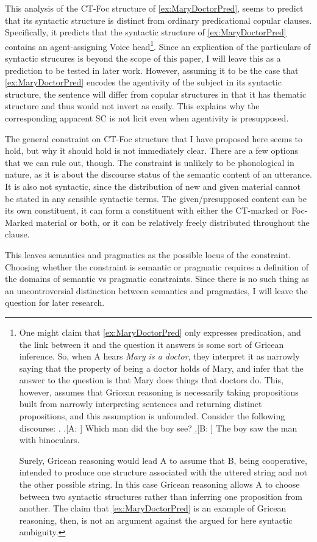 \documentclass[GPFinal]{subfiles}
\begin{document}
This analysis of the CT-Foc structure of \ref{ex:MaryDoctorPred}, seems to predict that its syntactic structure is distinct from ordinary predicational copular clauses.
Specifically, it predicts that the syntactic structure of \ref{ex:MaryDoctorPred} contains an agent-assigning Voice head\footnote{
  One might claim that \ref{ex:MaryDoctorPred} only expresses predication, and the link between it and the question it answers is some sort of Gricean inference.
  So, when A hears \textit{Mary is a doctor}, they interpret it as narrowly saying that the property of being a doctor holds of Mary, and infer that the answer to the question is that Mary does things that doctors do.
  This, however, assumes that Gricean reasoning is necessarily taking propositions built from narrowly interpreting sentences and returning distinct propositions, and this assumption is unfounded.
  Consider the following discourse:
  \ex. 
  \a.[A: ] Which man did the boy see?
  \b.[B: ] The boy saw the man with binoculars.

  Surely, Gricean reasoning would lead A to assume that B, being cooperative, intended to produce one structure associated with the uttered string and not the other possible string.
  In this case Gricean reasoning allows A to choose between two syntactic structures rather than inferring one proposition from another.
  The claim that \ref{ex:MaryDoctorPred} is an example of Gricean reasoning, then, is not an argument against the argued for here syntactic ambiguity.
}.
Since an explication of the particulars of syntactic strucures is beyond the scope of this paper, I will leave this as a prediction to be tested in later work.
However, assuming it to be the case that \ref{ex:MaryDoctorPred} encodes the agentivity of the subject in its syntactic structure, the sentence will differ from copular structures in that it has thematic structure and thus would not invert as easily.
This explains why the corresponding apparent SC is not licit even when agentivity is presupposed.

The general constraint on CT-Foc structure that I have proposed here seems to hold, but why it should hold is not immediately clear.
There are a few options that we can rule out, though.
The constraint is unlikely to be phonological in nature, as it is about the discourse status of the semantic content of an utterance.
It is also not syntactic, since the distribution of new and given material cannot be stated in any sensible syntactic terms.
The given/presupposed content can be its own constituent, it can form a constituent with either the CT-marked or Foc-Marked material or both, or it can be relatively freely distributed throughout the clause.

This leaves semantics and pragmatics as the possible locus of the constraint.
Choosing whether the constraint is semantic or pragmatic requires a definition of the domains of semantic vs pragmatic constraints.
Since there is no such thing as an uncontroversial distinction between semantics and pragmatics, I will leave the question for later research.
\end{document}
